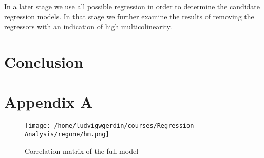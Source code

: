 \documentclass[11pt]{article}
\begin{document}
In a later stage we use all possible regression in order to determine the candidate regression models. 
In that stage we further examine the results of removing the regressors with an indication of high 
multicolinearity.

 

\newpage
\section{Conclusion}
\label{sec:org6004c14}


\section{Appendix A}
\label{sec:org3f640a6}
\begin{figure}[htbp]
\centering
\texttt{[image: /home/ludvigwgerdin/courses/Regression Analysis/regone/hm.png]}
\caption{\label{fig:org7110be5}
Correlation matrix of the full model}
\end{figure}
\end{document}
